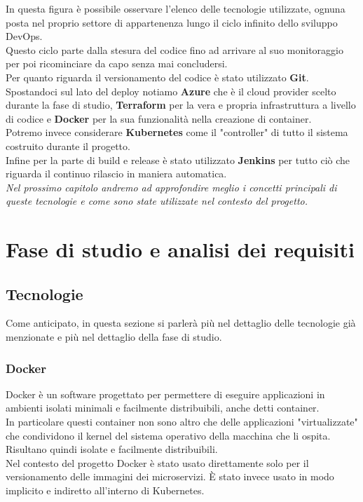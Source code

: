 \documentclass[a4paper,12pt]{report}
\begin{document}
In questa figura è possibile osservare l'elenco delle tecnologie utilizzate, ognuna posta nel proprio settore di appartenenza lungo il ciclo infinito dello sviluppo DevOps.\cite{devopsloop}\\
Questo ciclo parte dalla stesura del codice fino ad arrivare al suo monitoraggio per poi ricominciare da capo senza mai concludersi.\\
Per quanto riguarda il versionamento del codice è stato utilizzato \textbf{Git}. \\
Spostandoci sul lato del deploy notiamo \textbf{Azure} che è il cloud provider scelto durante la fase di studio, \textbf{Terraform} per la vera e propria infrastruttura a livello di codice e \textbf{Docker} per la sua funzionalità nella creazione di container.\\
Potremo invece considerare \textbf{Kubernetes}  come il "controller" di tutto il sistema costruito durante il progetto.\\
Infine per la parte di build e release è stato utilizzato \textbf{Jenkins} per tutto ciò che riguarda il continuo rilascio in maniera automatica.\\
\textit{Nel prossimo capitolo andremo ad approfondire meglio i concetti principali di queste tecnologie e come sono state utilizzate nel contesto del progetto.}


\chapter{Fase di studio e analisi dei requisiti}
\section{Tecnologie}
Come anticipato, in questa sezione si parlerà più nel dettaglio delle tecnologie già menzionate e più nel dettaglio della fase di studio.
\subsection{Docker}
Docker è un software progettato per permettere di eseguire applicazioni in ambienti isolati minimali e facilmente distribuibili, anche detti container. \cite{docker} \\
In particolare questi container non sono altro che delle applicazioni "virtualizzate" che condividono il kernel del sistema operativo della macchina che li ospita. Risultano quindi isolate e facilmente distribuibili. \\
Nel contesto del progetto Docker è stato usato direttamente solo per il versionamento delle immagini dei microservizi. È stato invece usato in modo implicito e indiretto all'interno di Kubernetes. \\ 
\end{document}
